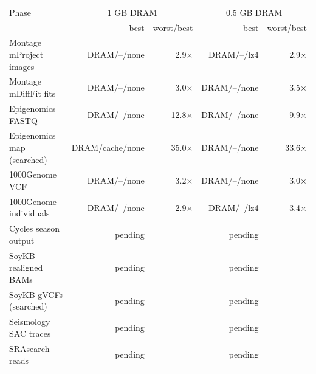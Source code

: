 \begin{tabular}{lrrrr}
\toprule
Phase & \multicolumn{2}{c}{1 GB DRAM} & \multicolumn{2}{c}{0.5 GB DRAM} \\
 & best & worst/best & best & worst/best \\
\midrule
Montage mProject images & DRAM/--/none & 2.9$\times$ & DRAM/--/lz4 & 2.9$\times$ \\
Montage mDiffFit fits & DRAM/--/none & 3.0$\times$ & DRAM/--/none & 3.5$\times$ \\
Epigenomics FASTQ & DRAM/--/none & 12.8$\times$ & DRAM/--/none & 9.9$\times$ \\
Epigenomics map (searched) & DRAM/cache/none & 35.0$\times$ & DRAM/--/none & 33.6$\times$ \\
1000Genome VCF & DRAM/--/none & 3.2$\times$ & DRAM/--/none & 3.0$\times$ \\
1000Genome individuals & DRAM/--/none & 2.9$\times$ & DRAM/--/lz4 & 3.4$\times$ \\
Cycles season output & pending &  & pending &  \\
SoyKB realigned BAMs & pending &  & pending &  \\
SoyKB gVCFs (searched) & pending &  & pending &  \\
Seismology SAC traces & pending &  & pending &  \\
SRAsearch reads & pending &  & pending &  \\
\bottomrule
\end{tabular}

